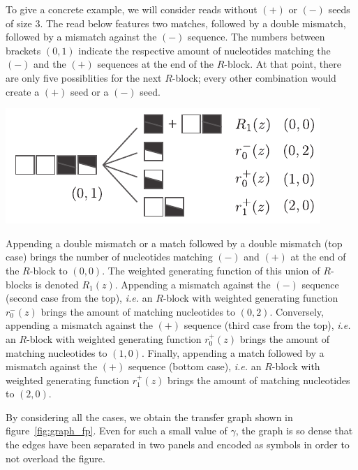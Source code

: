 \documentclass{article}
\newenvironment{inset}
{\vspace{0.5\baselineskip}\begin{center}}
{\end{center}\vspace{0.5\baselineskip}}
\begin{document}
To give a concrete example, we will consider reads without $(+)$ or $(-)$
seeds of size $3$. The read below features two matches, followed by a
double mismatch, followed by a mismatch against the $(-)$ sequence. The
numbers between brackets $(0,1)$ indicate the respective amount of
nucleotides matching the $(-)$ and the $(+)$ sequences at the end of the
$R$-block. At that point, there are only five possiblities for the next
$R$-block; every other combination would create a $(+)$ seed or a $(-)$
seed.

\begin{inset}
\includegraphics[scale=0.9]{example_dual.pdf}
\end{inset}

Appending a double mismatch or a match followed by a double mismatch (top
case) brings the number of nucleotides matching $(-)$ and $(+)$ at the end
of the $R$-block to $(0,0)$. The weighted generating function of this
union of $R$-blocks is denoted $R_1(z)$. Appending a mismatch against the
$(-)$ sequence (second case from the top), \textit{i.e.} an $R$-block with
weighted generating function $r_0^-(z)$ brings the amount of matching
nucleotides to $(0,2)$. Conversely, appending a mismatch against the $(+)$
sequence (third case from the top), \textit{i.e.} an $R$-block with
weighted generating function $r_0^+(z)$ brings the amount of matching
nucleotides to $(1,0)$. Finally, appending a match followed by a mismatch
against the $(+)$ sequence (bottom case), \textit{i.e.} an $R$-block with
weighted generating function $r_1^+(z)$ brings the amount of matching
nucleotides to $(2,0)$.


By considering all the cases, we obtain the transfer graph shown in
figure~\ref{fig:graph_fp}. Even for such a small value of $\gamma$, the
graph is so dense that the edges have been separated in two panels and
encoded as symbols in order to not overload the figure.
\end{document}
